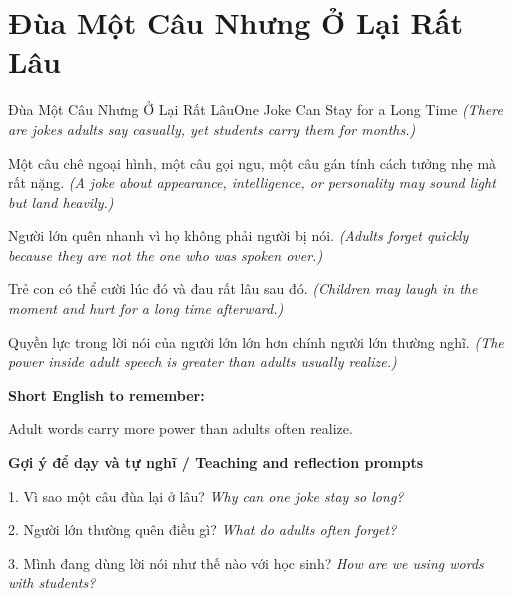 \section{Đùa Một Câu Nhưng Ở Lại Rất Lâu}
\begin{truyen}{Đùa Một Câu Nhưng Ở Lại Rất Lâu}{One Joke Can Stay for a Long Time}
\textit{(There are jokes adults say casually, yet students carry them for months.)}

Một câu chê ngoại hình, một câu gọi ngu, một câu gán tính cách tưởng nhẹ mà rất nặng.
\textit{(A joke about appearance, intelligence, or personality may sound light but land heavily.)}

Người lớn quên nhanh vì họ không phải người bị nói.
\textit{(Adults forget quickly because they are not the one who was spoken over.)}

Trẻ con có thể cười lúc đó và đau rất lâu sau đó.
\textit{(Children may laugh in the moment and hurt for a long time afterward.)}

\end{truyen}

\begin{baihoc}
Quyền lực trong lời nói của người lớn lớn hơn chính người lớn thường nghĩ.
\textit{(The power inside adult speech is greater than adults usually realize.)}
\end{baihoc}

\begin{ghinhoanh}
\textbf{Short English to remember:}

Adult words carry more power than adults often realize.

\end{ghinhoanh}

\begin{tuhocnhanh}
\textbf{Gợi ý để dạy và tự nghĩ / Teaching and reflection prompts}

1. Vì sao một câu đùa lại ở lâu? \textit{Why can one joke stay so long?}

2. Người lớn thường quên điều gì? \textit{What do adults often forget?}

3. Mình đang dùng lời nói như thế nào với học sinh? \textit{How are we using words with students?}
\end{tuhocnhanh}
\ngancach

